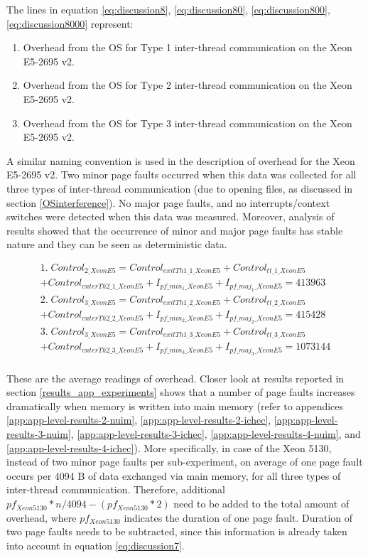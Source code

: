 The lines in equation \ref{eq:discussion8}, \ref{eq:discussion80}, \ref{eq:discussion800}, \ref{eq:discussion8000} represent:

\begin{enumerate}
  \item Overhead from the OS for Type 1 inter-thread communication on the Xeon E5-2695 v2.
  \item Overhead from the OS for Type 2 inter-thread communication on the Xeon E5-2695 v2.
  \item Overhead from the OS for Type 3 inter-thread communication on the Xeon E5-2695 v2.
\end{enumerate}

A similar naming convention is used in the description of overhead for the Xeon E5-2695 v2. Two minor page faults occurred when this data was collected for all three types of inter-thread communication (due to opening files, as discussed in section \ref{OSinterference}). No major page faults, and no interrupts/context switches were detected when this data was measured. Moreover, analysis of results showed that the occurrence of minor and major page faults has stable nature and they can be seen as deterministic data. 

\begin{equation}\label{eq:discussion8}
\begin{split}
1.\; Control_{2\_XeonE5} = Control_{exitTh1\_1\_XeonE5} + Control_{tt\_1\_XeonE5} \\ + Control_{enterTh2\_1\_XeonE5} + I_{pf\_min_1\_XeonE5} + I_{pf\_maj_1\_XeonE5} = 413963 \\
2.\; Control_{3\_XeonE5} = Control_{exitTh1\_2\_XeonE5} + Control_{tt\_2\_XeonE5} \\ + Control_{enterTh2\_2\_XeonE5} + I_{pf\_min_2\_XeonE5} + I_{pf\_maj_2\_XeonE5} = 415428 \\
3.\; Control_{3\_XeonE5} = Control_{exitTh1\_3\_XeonE5} + Control_{tt\_3\_XeonE5} \\ + Control_{enterTh2\_3\_XeonE5} + I_{pf\_min_3\_XeonE5} + I_{pf\_maj_3\_XeonE5} = 1073144 \\
\end{split}
\end{equation}

These are the average readings of overhead. Closer look at results reported in section \ref{results_app_experiments} shows that a number of page faults increases dramatically when memory is written into main memory (refer to appendices \ref{app:app-level-results-2-nuim}, \ref{app:app-level-results-2-ichec}, \ref{app:app-level-results-3-nuim}, \ref{app:app-level-results-3-ichec}, \ref{app:app-level-results-4-nuim}, and \ref{app:app-level-results-4-ichec}). More specifically, in case of the Xeon 5130, instead of two minor page faults per sub-experiment, on average of one page fault occurs per 4094 B of data exchanged via main memory, for all three types of inter-thread communication. Therefore, additional $pf_{Xeon5130} * n / 4094 - (pf_{Xeon5130} * 2)$ need to be added to the total amount of overhead, where $pf_{Xeon5130}$ indicates the duration of one page fault. Duration of two page faults needs to be subtracted, since this information is already taken into account in equation \ref{eq:discussion7}.

